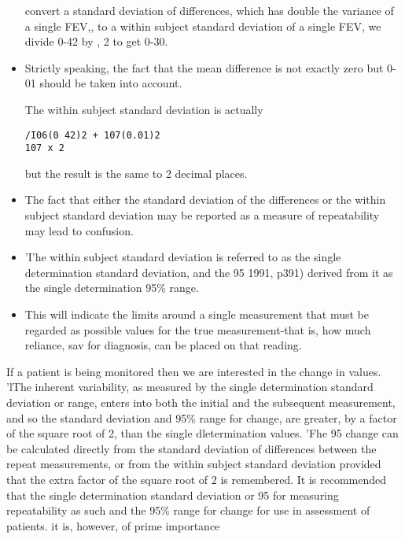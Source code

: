 \documentclass{article}
\begin{document}
\begin{itemize}
convert a standard deviation of differences,
which has double the variance of a single
FEV,, to a within subject standard deviation
of a single FEV, we divide 0-42 by ,
2 to get
0-30. \item Strictly speaking, the fact that the mean
difference is not exactly zero but 0-01 should
be taken into account. 

The within subject
standard deviation is actually

\begin{verbatim}
/I06(0 42)2 + 107(0.01)2
107 x 2
\end{verbatim}
but the result is the same to 2 decimal places.
\item The fact that either the standard deviation
of the differences or the within subject standard
deviation may be reported as a measure of repeatability may lead to confusion.
\item  'I'he
within subject standard deviation is referred
to as the single determination standard deviation,
and the 95%
1991, p391) derived from it as the single
determination 95\% range. \item This will indicate
the limits around a single measurement that
must be regarded as possible values for the
true measurement-that is, how much
reliance, sav for diagnosis, can be placed on
that reading.
\end{itemize}
If a patient is being monitored then we are
interested in the change in values. 'lThe
inherent variability, as measured by the single
determination standard deviation or range,
enters into both the initial and the subsequent
measurement, and so the standard deviation
and 95\% range for change, are greater, by a
factor of the square root of 2, than the single dletermination values. 'Fhe 95%
change can be calculated directly from the standard deviation of differences between the
repeat measurements, or from the within subject standard deviation provided that the extra factor of the square root of 2 is remembered.
It is recommended that the single determination standard deviation or 95%
for measuring repeatability as such and the
95\% range for change for use in assessment of
patients. it is, however, of prime importance
\end{document}

